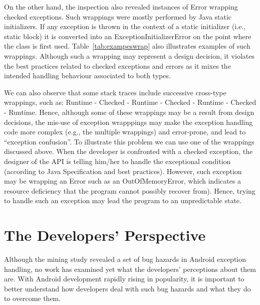 On the other hand, the inspection 
also revealed instances of Error wrapping checked exceptions. Such wrappings were 
mostly performed by Java static initializers. If any exception is thrown in the context of a static initializer 
(i.e., static block)  it is converted into an ExceptionInitializerError 
on the point where the class is first used.  Table~\ref{tab:exampeswrap} also illustrates
examples of such wrappings. Although such a wrapping may represent a design decision,
it violates the best practices related to checked exceptions and errors as it mixes the intended handling 
behaviour associated to both types.

We can also observe that some stack traces include successive cross-type wrappings, 
such as: Runtime - Checked - Runtime - Checked - Runtime - Checked -
Runtime. 
Hence, although some of these wrappings may be a result from design decisions, the mis-use of exception wrapppings may make the exception handling 
code more complex (e.g., the multiple wrappings) and error-prone,
 and lead to ``exception confusion''. To illustrate this problem we can use one of the wrappings discussed above.
When the developer is confronted with a checked exception, the designer of the API is telling him/her 
to handle the exceptional condition (according to Java Specification and 
best practices). However, such exception may be wrapping an Error such
as an OutOfMemoryError, which indicates a resource deficiency 
that the program cannot possibly recover from). Hence, trying to
handle such an exception  
may lead the program to an unpredictable state.

\bigskip


\bigskip

\section{The Developers' Perspective}
\label{sec:dev}

Although the mining study revealed a set of bug hazards in Android exception handling, no work has examined yet what the developers' perceptions about them are. With Android development rapidly rising in popularity, it is important to better understand how developers deal with such bug hazards and what they do to overcome them. 

